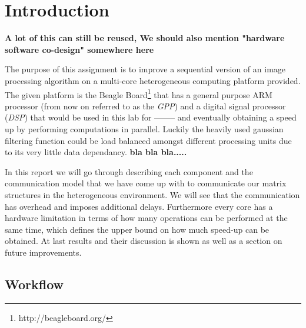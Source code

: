 \newpage
\section{Introduction}

\textbf{A lot of this can still be reused,  We should also mention "hardware software co-design" somewhere here}


The purpose of this assignment is to improve a sequential version of an image processing algorithm on a multi-core heterogeneous computing platform provided. The given platform is the Beagle Board\footnote{http://beagleboard.org/} that has a general purpose ARM processor (from now on referred to as the \emph{GPP}) and a digital signal processor (\emph{DSP}) that would be used in this lab for -------- and eventually obtaining a speed up by performing computations in parallel. Luckily the heavily used gaussian filtering function could be load balanced amongst different processing units due to its very little data dependancy. \textbf{bla bla bla..... }


In this report we will go through describing each component and the communication model that we have come up with to communicate our matrix structures in the heterogeneous environment. We will see that the communication has overhead and imposes additional delays. Furthermore every core has a hardware limitation in terms of how many operations can be performed at the same time, which defines the upper bound on how much speed-up can be obtained. At last results and their discussion is shown as well as a section on future improvements.


\subsection{Workflow}